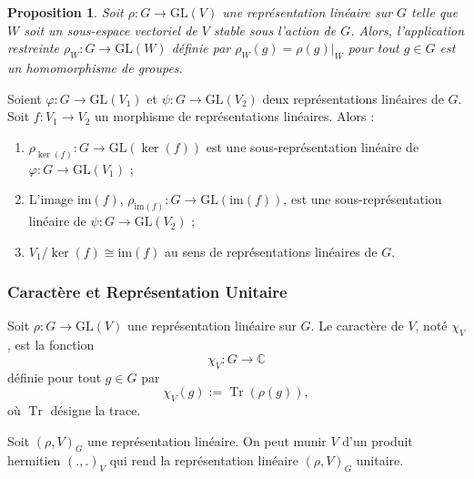 \documentclass[9pt]{beamer}
\newtheorem{proposition}{Proposition}
\begin{document}
\begin{frame}
	
\begin{proposition}
Soit \( \rho : G \rightarrow \mathrm{GL}(V) \) une représentation linéaire sur \( G \) telle que \( W \) soit un sous-espace vectoriel de \( V \) stable sous l'action de \( G \). Alors, l'application restreinte \( \rho_W : G \rightarrow \mathrm{GL}(W) \) définie par \( \rho_W(g) = \rho(g)|_W \) pour tout \( g \in G \) est un homomorphisme de groupes.
\end{proposition}


	
\begin{lemma}
Soient \( \varphi : G \to \mathrm{GL}(V_1) \) et \( \psi : G \to \mathrm{GL}(V_2) \) deux représentations linéaires de \( G \). Soit \( f : V_1 \to V_2 \) un morphisme de représentations linéaires. Alors :
		\begin{enumerate}[label=\roman*)]
			\item \( \rho_{\ker(f)} : G \to \mathrm{GL}(\ker(f)) \) est une sous-représentation linéaire de \( \varphi : G \to \mathrm{GL}(V_1) \) ;
			\item L'image \( \mathrm{im}(f) \), \( \rho_{\mathrm{im}(f)} : G \to \mathrm{GL}(\mathrm{im}(f)) \), est une sous-représentation linéaire de \( \psi : G \to \mathrm{GL}(V_2) \) ;
			\item \( V_1 / \ker(f) \cong \mathrm{im}(f) \) au sens de représentations linéaires de \( G \).
		\end{enumerate}
\end{lemma}
\end{frame}	




\begin{frame}
	\frametitle{Caractère et Représentation Unitaire}
	
	\begin{definition}
Soit \( \rho : G \to \mathrm{GL}(V) \) une représentation linéaire sur \( G \). Le caractère de \( V \), noté \( \chi_V \), est la fonction
		\[
		\chi_V : G \to \mathbb{C}
		\]
		définie pour tout \( g \in G \) par
		\[
		\chi_V(g) := \operatorname{Tr}(\rho(g)),
		\]
		où \( \operatorname{Tr} \) désigne la trace.
	\end{definition}
	
	
	\begin{theorem} 
Soit \( (\rho, V)_G \) une représentation linéaire. On peut munir \( V \) d'un produit hermitien \( (.,.)_V \) qui rend la représentation linéaire \( (\rho, V)_G \) unitaire.
	\end{theorem}
	
\end{frame}
\end{document}
